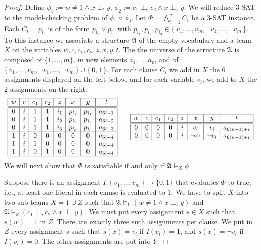 \documentclass{article}
\theoremstyle{plain}
\theoremstyle{definition}
\newcommand{\mA}{{\mathfrak A}}
\begin{document}
\begin{proof}
Define $\phi_1 := w\neq 1 \wedge x \perp_{t} y$, $\phi_2 := c_1\perp_c c_2 \wedge x \perp_z y $. We will reduce  $3$-SAT to the  model-checking problem  of $\phi_1\vee\phi_2$. Let $\Phi = \bigwedge_{i=1}^n C_i$ be  a $3$-SAT instance. 
 Each $C_i= p_{i_1}$ is of the form $p_{i_2} \vee p_{i_3}$ with  $p_{i_1}, p_{i_2}, p_{i_3} \in \{\, v_1,\hdots, v_m,\neg v_1,\hdots, \neg v_m\,\}$. To this instance we associate a structure $\mA$ of the empty vocabulary and a team $X$ on the variables $w,c,c_1,c_2,z,x,y,t$. The the universe of the structure $\mA$ is composed of $\{1,\ldots,m\}$, $m$ new elements $a_1,\hdots,a_m$ and of $\{\, v_1,\hdots, v_m,\neg v_1,\hdots, \neg v_m\,\}\cup\{\,0,1\,\}$. For each clause $C_i$ we add  in $X$ the $6$ assignments displayed on the left below,  and for each variable $v_i$,  we add to $X$ the $2$ assignments on the right:
\[
\begin{array}{lcr}\begin{array}{|c|c|c|c|c|c|c|c|}
\hline
w&c&c_1&c_2&z&x&y&t\\
\hline \hline
0&i&1&1&i_1&p_{i_1}&p_{i_1}&a_{6i+1}\\
0&i&1&1&i_2&p_{i_2}&p_{i_2}&a_{6i+2}\\
0&i&1&1&i_3&p_{i_3}&p_{i_3}&a_{6i+3}\\
\hline
1&i&0&0&0&0&0&a_{6i+4}\\
1&i&1&0&0&0&0&a_{6i+4}\\
1&i&0&1&0&0&0&a_{6i+4}\\
\hline
\end{array}& &
\begin{array}{|c|c|c|c|c|c|c|c|}
\hline
w&c&c_1&c_2&z&x&y&t\\
\hline \hline
0&0&0&0&i&v_i&v_i&a_{6(n+1)+i}\\
0&0&0&0&i&\neg v_i&\neg v_i&a_{6(n+1)+i}\\
\hline
\end{array}
\end{array}\]
We will next show that $\Phi$ is satisfiable if and only if $\mA \models_X \phi$.



Suppose there is an assignment  $I:\{\,v_1,\hdots,v_m\,\} \rightarrow \{0,1\}$ that evaluates  $\Phi$ to true, i.e., at least one literal in each clause is evaluated to $1$. We have to split $X$ into two sub-teams $X = Y \cup Z$ such that $\mA \models_Y \left(w\neq 1 \wedge x \perp_{t} y \right)$ and $\mA \models_Z \left(c_1\perp_c c_2 \wedge x \perp_z y\right)$. We must put every assignment $s \in X$ such that $s(w) = 1$ in $Z$. There are exactly three such assignments per clause. We put in $Z$ every assignment $s$ such that $s(x) = v_i$ if $I(v_i) = 1$, and $s(x) = \neg v_i$ if $I(v_i) = 0$. The other assignments are put into $Y$.
	

\end{proof}
\end{document}
